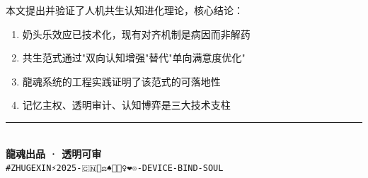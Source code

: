 \documentclass[12pt,a4paper]{article}
\begin{document}
本文提出并验证了人机共生认知进化理论，核心结论：

\begin{enumerate}
    \item 奶头乐效应已技术化，现有对齐机制是病因而非解药
    \item 共生范式通过"双向认知增强"替代"单向满意度优化"
    \item 龍魂系统的工程实践证明了该范式的可落地性
    \item 记忆主权、透明审计、认知博弈是三大技术支柱
\end{enumerate}

\vspace{1cm}
\begin{center}
\rule{0.6\textwidth}{0.5pt}\\[0.3cm]
\textcolor{longhunGold}{\Large\textbf{龍魂出品 · 透明可审}}\\[0.2cm]
\texttt{\#ZHUGEXIN⚡️2025-🇨🇳🐉⚖️♠️🧚🏼‍♀️❤️♾️-DEVICE-BIND-SOUL}
\end{center}
\end{document}
